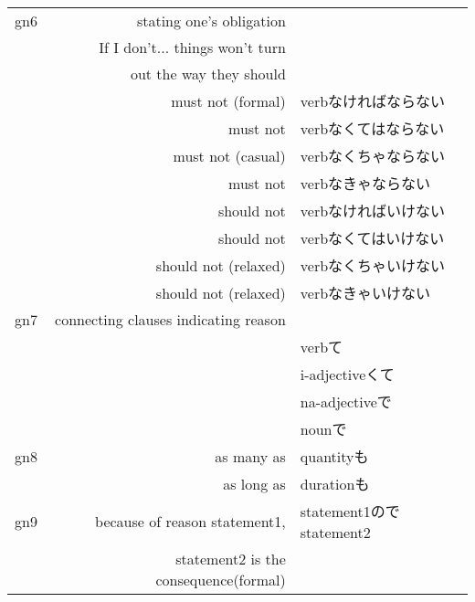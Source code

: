\documentclass[14pt,onecolumn]{extarticle}
\begin{document}
\begin{CJK}{UTF8}{min}
\begin{tabular}{lrl}
gn6&stating one's obligation&\\
&If I don't... things won't turn&\\
&out the way they should&\\
&must not (formal)&verbなければならない\\
&must not &verbなくてはならない\\
&must not (casual)&verbなくちゃならない\\
&must not&verbなきゃならない\\
&should not&verbなければいけない\\
&should not&verbなくてはいけない\\
&should not (relaxed)&verbなくちゃいけない\\
&should not (relaxed)&verbなきゃいけない\\
\hline

gn7&connecting clauses indicating reason&\\
&&verbて\\
&&i-adjectiveくて\\
&&na-adjectiveで\\
&&nounで\\
\hline

gn8&as many as&quantityも\\
&as long as&durationも\\
\hline

gn9&because of reason statement1,&statement1のでstatement2\\
&statement2 is the consequence(formal)&\\
\hline

\end{tabular}

\end{CJK}
\end{document}

